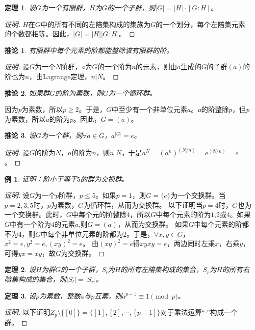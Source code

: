 \documentclass{article}
\newtheorem{Thm}{定理}
\newtheorem*{Example}{例}
\newtheorem{Cor}{推论}
\begin{document}
\begin{CJK*}{UTF8}{gbsn}
\begin{Thm}
 设$G$为一个有限群，$H$为$G$的一个子群，则$|G|=|H|\cdot [G:H]$。 
\end{Thm}
\begin{proof}[证明]
  $H$在$G$中的所有不同的左陪集构成的集族为$G$的一个划分，每个左陪集元素的个数都相等。因此，$|G|=|H||G:H|$。
\end{proof}
\begin{Cor}
有限群中每个元素的阶都能整除该有限群的阶。
\end{Cor}
\begin{proof}[证明]
  设$G$为一个$N$阶群，$a$为$G$的一个阶为$n$的元素，则由$a$生成的$G$的子群$(a)$的阶也为$n$，由Lagrange定理，$n|N$。
\end{proof}
\begin{Cor}
  如果群$G$的阶为素数，则$G$为一个循环群。
\end{Cor}
因为$p$为素数，所以$p\geq 2$。于是，$G$中至少有一个非单位元素$a$。$a$的阶整除$p$，但$p$为素数，所以$a$的阶为$p$。因此，$G=(a)$。
\begin{Cor}
  设$G$为一个群，则$\forall a\in G$，$a^{|G|}=e$。
\end{Cor}
\begin{proof}[证明]
  设$G$的阶为$N$，$a$的阶为$n$，则$n|N$，于是$a^N=(a^n)^{(N/n)}=e^{(N/n)}=e$。
\end{proof}
\begin{Example}
  证明：阶小于等于$5$的群为交换群。
\end{Example}
\begin{proof}[证明]
  设$G$为一个$p$阶群，$p\leq 5$。如果$p=1$，则$G=\{e\}$为一个交换群。当$p=2,3,5$时，$p$为素数，$G$为循环群，从而为交换群。
  以下证明当$p=4$时，$G$也为一个交换群。此时，$G$中每个元的阶整除$4$，所以$G$中每个元素的阶为$1$,$2$或$4$。如果$G$中有一个阶为$4$的元素$a$,则$G=(a)$，从而为交换群。
  如果$G$中每个元素的阶都不为$4$，则$G$中每个非单位元素的阶都为$2$。于是，$\forall x,y\in G$，$x^2=e,y^2=e,(xy)^2=e$。
  由$(xy)^2=e$得$xyxy=e$，两边同时左乘$x$，右乘$y$，可得$yx=xy$，故$G$为交换群。

\end{proof}
\begin{Thm}
  设$H$为群$G$的一个子群，$S_l$为$H$的所有左陪集构成的集合，$S_r$为$H$的所有右陪集构成的集合，则$|S_l|=|S_r|$。
\end{Thm}

\begin{Thm}
  设$p$为素数，整数$a$与$p$互素，则$a^{p-1}\equiv 1 \pmod p$。
\end{Thm}
\begin{proof}[证明]
  以下证明$Z_p\setminus \{[0]\}=\{[1],[2],\cdots,[p-1]\}$对于乘法运算“$\cdot$”构成一个群。


\end{proof}
\end{CJK*}
\end{document}
